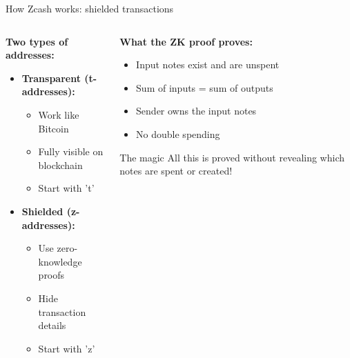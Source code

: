 \documentclass[aspectratio=169, lualatex, handout]{beamer}
\begin{document}
\begin{frame}{How Zcash works: shielded transactions}
	\begin{columns}[c]
		\begin{column}{0.5\textwidth}
			\textbf{Two types of addresses:}
			\begin{itemize}
				\item \textbf{Transparent (t-addresses):}
				      \begin{itemize}
					      \item Work like Bitcoin
					      \item Fully visible on blockchain
					      \item Start with 't'
				      \end{itemize}
				\item \textbf{Shielded (z-addresses):}
				      \begin{itemize}
					      \item Use zero-knowledge proofs
					      \item Hide transaction details
					      \item Start with 'z'
				      \end{itemize}
			\end{itemize}
		\end{column}
		\begin{column}{0.5\textwidth}
			\textbf{What the ZK proof proves:}
			\begin{itemize}
				\item Input notes exist and are unspent
				\item Sum of inputs = sum of outputs
				\item Sender owns the input notes
				\item No double spending
			\end{itemize}
			\vspace{0.5em}
			\begin{alertblock}{The magic}
				All this is proved without revealing which notes are spent or created!
			\end{alertblock}
		\end{column}
	\end{columns}
\end{frame}
\end{document}
